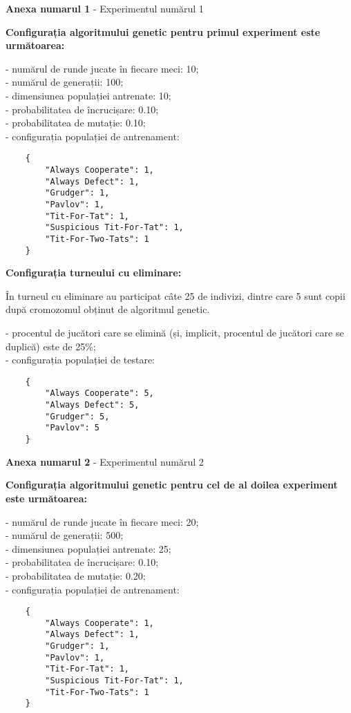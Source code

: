 \begin{center}
	\textbf{Anexa numarul 1} - Experimentul numărul 1
\end{center}

\textbf{Configurația algoritmului genetic pentru primul experiment este următoarea:}

- numărul de runde jucate în fiecare meci: 10;\\
- numărul de generații: 100;\\
- dimensiunea populației antrenate: 10;\\
- probabilitatea de încrucișare: 0.10;\\
- probabilitatea de mutație: 0.10;\\
- configurația populației de antrenament:\\
\begin{center}
	\begin{lstlisting}
	{
		"Always Cooperate": 1,
		"Always Defect": 1,
		"Grudger": 1,
		"Pavlov": 1,
		"Tit-For-Tat": 1,
		"Suspicious Tit-For-Tat": 1,
		"Tit-For-Two-Tats": 1
	}
\end{lstlisting}
\end{center}
 
\textbf{Configurația turneului cu eliminare:}

În turneul cu eliminare au participat câte 25 de indivizi, dintre care 5 sunt copii după cromozomul obținut de algoritmul genetic. 

- procentul de jucători care se elimină (și, implicit, procentul de jucători care se duplică) este de 25\%;\\
- configurația populației de testare:\\
\begin{center}
	\begin{lstlisting}
	{
		"Always Cooperate": 5,
		"Always Defect": 5,
		"Grudger": 5,
		"Pavlov": 5
	}
	\end{lstlisting}
\end{center}

\clearpage

\begin{center}
	\textbf{Anexa numarul 2} - Experimentul numărul 2
\end{center}

\textbf{Configurația algoritmului genetic pentru cel de al doilea experiment este următoarea:}

- numărul de runde jucate în fiecare meci: 20;\\
- numărul de generații: 500;\\
- dimensiunea populației antrenate: 25;\\
- probabilitatea de încrucișare: 0.10;\\
- probabilitatea de mutație: 0.20;\\
- configurația populației de antrenament:\\
\begin{center}
	\begin{lstlisting}
	{
		"Always Cooperate": 1,
		"Always Defect": 1,
		"Grudger": 1,
		"Pavlov": 1,
		"Tit-For-Tat": 1,
		"Suspicious Tit-For-Tat": 1,
		"Tit-For-Two-Tats": 1
	}
	\end{lstlisting}
\end{center}

